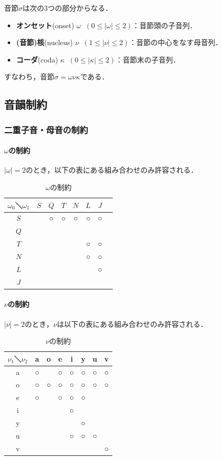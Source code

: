 \documentclass[../../main-detail.tex]{subfiles}
\begin{document}
音節$\sigma$は次の3つの部分からなる．
\begin{itemize}
    \item \textbf{オンセット}(onset) $\omega\;\; (0\leq |\omega| \leq 2)$：音節頭の子音列．
    \item \textbf{(音節)核}(nucleus) $\nu\;\; (1\leq |\nu| \leq 2)$：音節の中心をなす母音列．
    \item \textbf{コーダ}(coda) $\kappa\;\; (0\leq |\kappa| \leq 2)$：音節末の子音列．
\end{itemize}
すなわち，音節$\sigma = \omega\nu\kappa$である．

\subsection{音韻制約}
\subsubsection{二重子音・母音の制約}\label{vpsi}
\paragraph{$\omega$の制約}
$|\omega| = 2$のとき，以下の表にある組み合わせのみ許容される．
\begin{table}[H]
  \centering
  \caption{$\omega$の制約}
  \begin{tabular}{cccccccc}
    \toprule
    $\omega_0$＼$\omega_1$ & $S$ & $Q$ & $T$ & $N$ & $L$ & $J$\\
    \midrule
    $S$ & & ○ & ○ & ○ & ○ & ○\\
    $Q$ & & & & & & & \\
    $T$ & & & & & ○ & ○\\
    $N$ & & & & & ○ & ○\\
    $L$ & & & & & & ○\\
    $J$ & & & & & & &\\
    \bottomrule
  \end{tabular}
\end{table}
\paragraph{$\nu$の制約}
$|\nu|=2$のとき，$\nu$は以下の表にある組み合わせのみ許容される．
\begin{table}[H]
  \caption{$\nu$の制約}
  \centering
  \begin{tabular}{cccccccc}
    \toprule
    $\nu_1$＼$\nu_2$ & a & o & e & i & y & u & v\\
    \midrule
    a & ○ & & ○ & ○ & ○ & ○ & ○\\
    o & ○ & ○ & ○ & ○ & ○ & ○ & ○\\
    e & ○ & & ○ & ○ & ○ & &\\
    i & & & & ○& & & \\
    y & & & & & ○ & & \\
    u & & & & ○ & ○ & ○ & \\
    v & & & & & & & ○\\
    \bottomrule
  \end{tabular}
\end{table}
\end{document}
